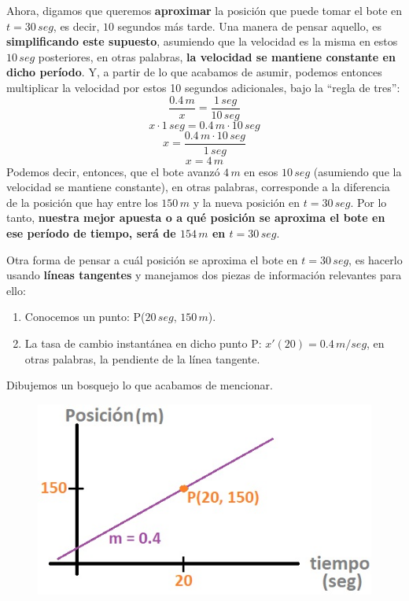 \documentclass[12pt]{article}
\begin{document}
Ahora, digamos que queremos \textbf{aproximar} la posición que puede tomar el bote en $t = 30\, seg$, es decir, $10$ segundos más tarde. Una manera de pensar aquello, es \textbf{simplificando este supuesto}, asumiendo que la velocidad es la misma en estos $10 \, seg$ posteriores, en otras palabras, \textbf{la velocidad se mantiene constante en dicho período}. Y, a partir de lo que acabamos de asumir, podemos entonces multiplicar la velocidad por estos 10 segundos adicionales, bajo la ``regla de tres'':
\[\frac{0.4 \, m}{x} = \frac{1 \, seg}{10 \, seg}\]
\[x \cdot 1 \, seg = 0.4 \, m \cdot 10 \, seg\]
\[x = \frac{0.4 \, m \cdot 10 \, seg}{1 \, seg}\]
\[x = 4 \, m\]
Podemos decir, entonces, que el bote avanzó $4 \, m$ en esos $10 \, seg$ (asumiendo que la velocidad se mantiene constante), en otras palabras, corresponde a la diferencia de la posición que hay entre los $150 \,m$ y la nueva posición en $t = 30 \, seg$. Por lo tanto, \textbf{nuestra mejor apuesta o a qué posición se aproxima el bote en ese período de tiempo, será de $154 \, m$ en $t = 30 \, seg$}.

Otra forma de pensar a cuál posición se aproxima el bote en $t = 30 \, seg$, es hacerlo usando \textbf{líneas tangentes} y manejamos dos piezas de información relevantes para ello:

\begin{enumerate}
\item Conocemos un punto: P($20 \, seg$, $150 \, m$).
\item La tasa de cambio instantánea en dicho punto P: $x'(20) = 0.4 \, m/seg$, en otras palabras, la pendiente de la línea tangente.
\end{enumerate}

Dibujemos un bosquejo lo que acabamos de mencionar.

\begin{figure}[hbt!]
\centering
\includegraphics[scale=0.7]{img/approx_lin_examp_2.jpg}
\end{figure}
\end{document}
